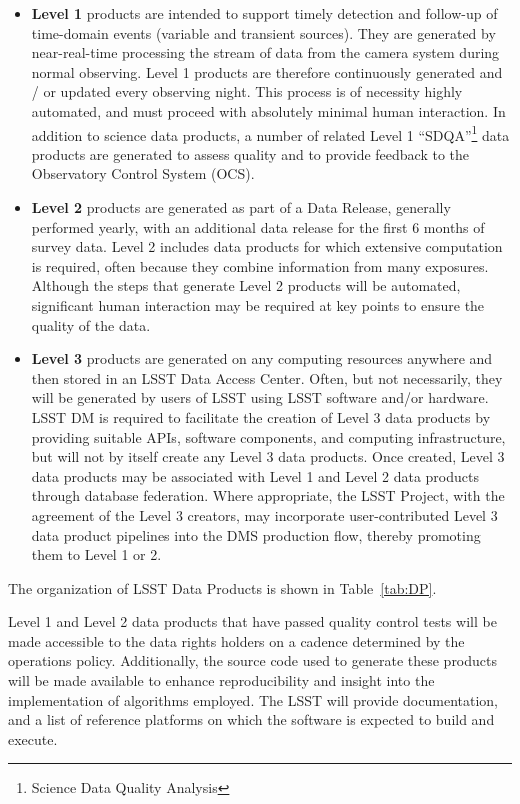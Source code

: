 \begin{itemize}
\item \textbf{Level 1} products are intended to support timely detection and follow-up
  of time-domain events (variable and transient sources). They are generated by
  near-real-time processing the stream of data from the camera system during
  normal observing.  Level 1 products are therefore continuously generated and / or
  updated every observing night. This process is of necessity highly
  automated, and must proceed with absolutely minimal human
  interaction.  In addition to science data products, a number of related
  Level 1 ``SDQA''\footnote{Science Data Quality Analysis} data products are generated
  to assess quality and to provide feedback to the Observatory Control System (OCS).

\item \textbf{Level 2} products are generated as part of a Data Release, generally
  performed
  yearly, with an additional data release for the first 6 months of survey data.
  Level 2 includes data products for which extensive
  computation is required, often because they combine information from
  many exposures.  Although the steps that generate Level 2 products
  will be automated, significant human interaction may be required at
  key points to ensure the quality of the data.

\item \textbf{Level 3} products are generated on any computing resources
  anywhere and then stored in an LSST Data Access Center. Often, but not
  necessarily, they will be generated by users of LSST using LSST software
  and/or hardware. LSST DM is required to facilitate the creation of
  Level 3 data products by providing suitable APIs, software components, and
  computing infrastructure, but will not by itself create any Level 3
  data products. Once created, Level 3 data products may be associated with
  Level 1 and Level 2 data products through database federation.
  Where appropriate, the LSST Project, with the agreement of the Level 3
  creators, may incorporate user-contributed Level 3 data product pipelines
  into the DMS production flow, thereby promoting them to Level 1 or 2.

\end{itemize}

The organization of LSST Data Products is shown in Table~\ref{tab:DP}.

Level 1 and Level 2 data products that have passed quality control tests will be made accessible to the data rights holders on a cadence determined by the operations policy. Additionally, the source code used to generate these products will be made available to enhance reproducibility and insight into the implementation of algorithms employed. The LSST will provide documentation, and a list of reference platforms on which the software is expected to build and execute.

